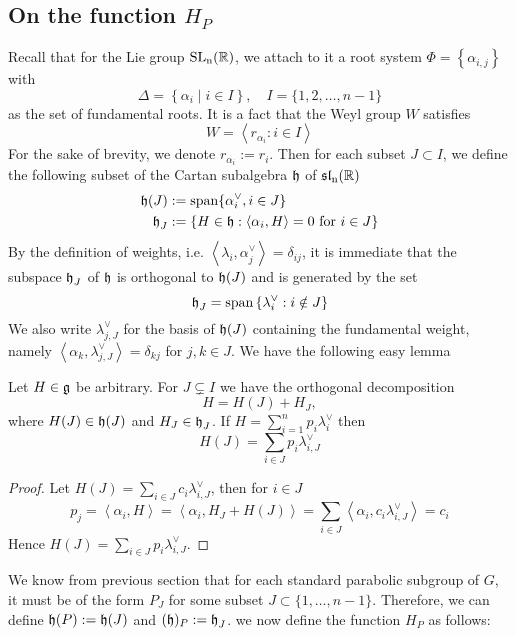 \subsection{On the function $H_P$}
Recall that for the Lie group $\operatorname{\text{SL}_n(\mathbb{R})}$, we attach to it a root system $\Phi = \left\lbrace \alpha_{i,j}\right\rbrace$ with
\[\Delta = \left\lbrace \alpha_i\mid i \in I \right\rbrace, \quad I = \{1,2,\ldots,n-1\}\]
as the set of fundamental roots. It is a fact that the Weyl group $W$ satisfies
\[W = \left\langle r_{\alpha_i}: i \in I \right\rangle\]
For the sake of brevity, we denote $r_{\alpha_i}:=r_i$. Then for each subset $J \subset I$,
we define the following subset of the Cartan subalgebra $\operatorname{\mathfrak{h}}$ of $\operatorname{\mathfrak{sl}_n(\mathbb{R})}$
\begin{align*}
    \operatorname{\mathfrak{h}}(J) & :=\text{span}\{ \alpha^\vee_i, i \in J\}                                       \\
    \operatorname{\mathfrak{h}}_J  & := \{H \in \operatorname{\mathfrak{h}}: \left\langle \alpha_i,H\right\rangle=0 \mbox{ for } i \in J \}
\end{align*}
By the definition of weights, i.e. $\left\langle \lambda_i,\alpha^\vee_j \right\rangle = \delta_{ij}$, it is immediate
that the subspace $\operatorname{\mathfrak{h}}_J$ of $\operatorname{\mathfrak{h}}$ is orthogonal to $\operatorname{\mathfrak{h}}(J)$ and is generated by the set
\[\operatorname{\mathfrak{h}}_J = \text{span}\left\lbrace \lambda^\vee_i: i \notin J\right\rbrace \]
We also write $\lambda^{\vee}_{j,J}$ for the basis of $\operatorname{\mathfrak{h}}(J)$ containing the fundamental
weight, namely $\left\langle \alpha_k,\lambda^{\vee}_{j,J}\right\rangle = \delta_{kj}$ for $j,k \in J$. We have
the following easy lemma
\begin{lemma}\label{coeff-H(J)}
    Let $H \in \operatorname{\mathfrak{g}}$ be arbitrary. For $J \subsetneq I$ we have the orthogonal decomposition
    \[H = H(J)+H_J,\]
    where $H(J) \in \operatorname{\mathfrak{h}}(J)$ and $H_J \in \operatorname{\mathfrak{h}}_J$. If $H = \sum_{i=1}^n p_i\lambda^\vee_i$ then
    \[H(J) = \sum_{i \in J} p_i \lambda^\vee_{i,J}\]
\end{lemma}
\begin{proof}
    Let $H(J) = \sum_{i \in J} c_i \lambda^\vee_{i,J}$, then for $i \in J$
    \[p_j = \left\langle \alpha_i,H \right\rangle =\left\langle \alpha_i,H_J+H(J) \right\rangle = \sum_{i \in J}\left\langle \alpha_i,  c_i \lambda^\vee_{i,J}\right\rangle=c_i \]
    Hence $H(J) = \sum_{i \in J} p_i \lambda^\vee_{i,J}$.
\end{proof}
We know from previous section that for each standard parabolic subgroup of $G$, it must be of the form
$P_J$ for some subset $J \subset \{1,\ldots,n-1\}$. Therefore, we can define $\operatorname{\mathfrak{h}}(P):= \operatorname{\mathfrak{h}}(J)$ and $
    (\operatorname{\mathfrak{h}})_P:= \operatorname{\mathfrak{h}}_J$. we now define the function $H_P$ as follows:
